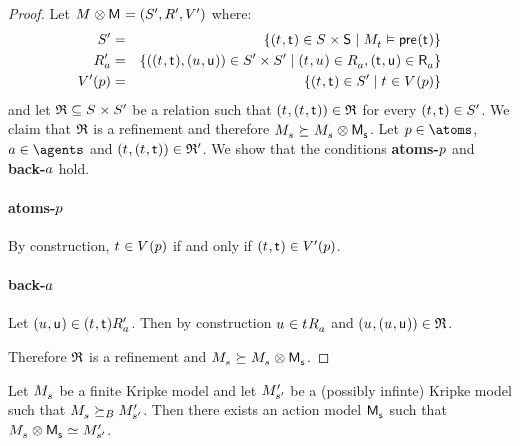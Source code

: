 \begin{proof}
Let $\kModel \exec \aModel = \kModelTupleP$ where:
\begin{eqnarray*}
    \kStatesP &=& \{(\kStateT, \aStateT) \in \kStates \times \aStates \mid \kPModel{\kStateT} \entails \aPrecondition(\aStateT)\}\\
    \kAccessibilityPA &=& \{((\kStateT, \aStateT), (\kStateU, \aStateU)) \in \kStatesP \times \kStatesP \mid (\kStateT, \kStateU) \in \kAccessibilityA, (\aStateT, \aStateU) \in \aAccessibilityA\}\\
    \kValuationP(\atomP) &=& \{(\kStateT, \aStateT) \in \kStatesP \mid \kStateT \in \kValuation(\atomP)\}
\end{eqnarray*}
and let $\refinement \subseteq \kStates \times \kStatesP$ be a relation such that $(\kStateT, (\kStateT, \aStateT)) \in \refinement$ for every $(\kStateT, \aStateT) \in \kStatesP$.
We claim that $\mathfrak{R}$ is a refinement and therefore $\kPModel{\kStateS} \simulates \kPModel{\kStateS} \exec \aPModel{\aStateS}$.
Let $\atomP \in \atoms$, $\agentA \in \agents$ and $(\kStateT, (\kStateT, \aStateT)) \in \refinement'$.
We show that the conditions {\bf atoms-$p$} and {\bf back-$a$} hold.

\paragraph{atoms-$p$}
By construction, $\kStateT \in \kValuation(\atomP)$ if and only if $(\kStateT, \aStateT) \in \kValuationP(\atomP)$.

\paragraph{back-$a$}
Let $(\kStateU, \aStateU) \in \kSuccessorsPA{(\kStateT, \aStateT)}$.
Then by construction $\kStateU \in \kSuccessorsA{\kStateT}$ and $(\kStateU, (\kStateU, \aStateU)) \in \refinement $.

Therefore $\mathfrak{R}$ is a refinement and $\kPModel{\kStateS} \simulates \kPModel{\kStateS} \exec \aPModel{\aStateS}$.
\end{proof}

\begin{proposition}
Let $\kPModel{\kStateS}$ be a finite Kripke model and let ${M^{\prime}_{{s}^{\prime}}}$ be a (possibly infinte) Kripke model such that $\kPModel{\kStateS} \simulatesBs \kPModelP{\kStateSP}$.
Then there exists an action model $\aPModel{\aStateS}$ such that $\kPModel{\kStateS} \exec \aPModel{\aStateS} \bisimilar \kPModelP{\kStateSP}$.
\end{proposition}

